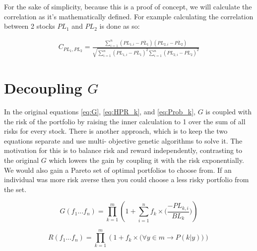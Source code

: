 \documentclass[11pt]{article}
\begin{document}
    For the sake of simplicity, because this is a proof of concept, we will calculate the
    correlation as it's mathematically defined.
    For example calculating the correlation between 2 stocks \(PL_1\) and \(PL_2\) is
    done as so:

    \begin{align}
        C_{PL_1, PL_2} = 
        \frac{
            \displaystyle\sum^{n}_{i=1} (PL_{1, i} - \overline {PL_1})(PL_{2, i} - \overline {PL_2})
        }{
            \sqrt{
                \displaystyle\sum^{n}_{i=1}(PL_{1,i} - \overline {PL_1})^2 
                \displaystyle\sum^{n}_{i=1}(PL_{2,i} - \overline {PL_2})^2
            }
        }
        \label{eq:Correlation}
    \end{align}

\section{Decoupling \(G\)} \label{section:DecoupleG}

    In the original equations \ref{eq:G}, \ref{eq:HPR_k}, and \ref{eq:Prob_k},
    \(G\) is coupled with the risk of the portfolio
    by raising the inner calculation to 1 over the sum of all risks for every stock.
    There is another approach, which is to keep the two equations separate and use multi-
    objective genetic algorithms to solve it. The motivation for this is to balance risk
    and reward independently, contrasting to the original \(G\) which lowers the gain
    by coupling it with the risk exponentially. We would also gain a Pareto set of
    optimal portfolios to choose from. If an individual was more risk averse then you could choose
    a less risky portfolio from the set.

    \begin{equation}\label{eq:DecoupleG}
        G(f_1...f_n) = \displaystyle\prod^{m}_{k=1} \left(
                1 + \displaystyle\sum^{n}_{i=1} f_k \times \Big(
                    \frac{- PL_{k,i} }{BL_k}
                \Big)
            \right)
    \end{equation}

    \begin{equation}\label{eq:DecoupleR}
        R(f_1...f_n) = \displaystyle\prod^{m}_{k=1} \left(
                1 + f_k \times \Big(
                    \forall y \in m \to P(k|y)
                \Big)
            \right)
    \end{equation}
\end{document}
